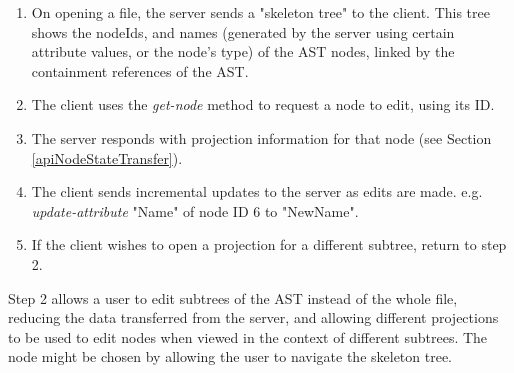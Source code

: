\documentclass{article}
\begin{document}
\begin{enumerate}
\item On opening a file, the server sends a "skeleton tree" to the client. This tree shows the nodeIds, and names (generated by the server using certain attribute values, or the node's type) of the AST nodes, linked by the containment references of the AST.
\item The client uses the \emph{get-node} method to request a node to edit, using its ID. 
\item The server responds with projection information for that node (see Section \ref{apiNodeStateTransfer}).
\item The client sends incremental updates to the server as edits are made. e.g. \emph{update-attribute} "Name" of node ID 6 to "NewName".
\item If the client wishes to open a projection for a different subtree, return to step 2.
\end{enumerate}{
Step 2 allows a user to edit subtrees of the AST instead of the whole file, reducing the data transferred from the server, and allowing different projections to be used to edit nodes when viewed in the context of different subtrees. The node might be chosen by allowing the user to navigate the skeleton tree.

}
\end{document}
